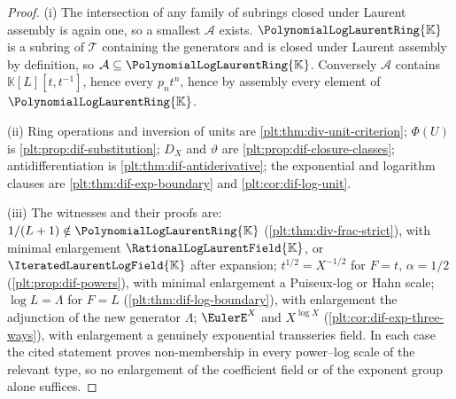 \documentclass[11pt,oneside]{article}
\theoremstyle{plain}
\theoremstyle{definition}
\theoremstyle{remark}
\newcommand{\K}{\mathbb{K}}
\newcommand{\PLlau}{\PolynomialLogLaurentRing{\K}}       %
\newcommand{\PLrat}{\RationalLogLaurentField{\K}}        %
\newcommand{\PLit}{\IteratedLaurentLogField{\K}}         %
\newcommand{\DX}{D_{X}}                                  %
\newcommand{\EulerOp}{\vartheta}                         %
\begin{document}
\begin{proof}
(i)  The intersection of any family of subrings closed under Laurent assembly
is again one, so a smallest \(\mathcal A\) exists.  \(\PLlau\) is a subring of
\(\mathcal T\) containing the generators and is closed under Laurent assembly
by definition, so \(\mathcal A\subseteq\PLlau\).  Conversely \(\mathcal A\)
contains \(\K[L][t,t^{-1}]\), hence every \(p_{n}t^{n}\), hence by assembly
every element of \(\PLlau\).

(ii)  Ring operations and inversion of units are
\cref{plt:thm:div-unit-criterion}; \(\Phi(U)\) is
\cref{plt:prop:dif-substitution}; \(\DX\) and \(\EulerOp\) are
\cref{plt:prop:dif-closure-classes}; antidifferentiation is
\cref{plt:thm:dif-antiderivative}; the exponential and logarithm clauses are
\cref{plt:thm:dif-exp-boundary} and \cref{plt:cor:dif-log-unit}.

(iii)  The witnesses and their proofs are: \(1/(L+1)\notin\PLlau\)
(\cref{plt:thm:div-frac-strict}), with minimal enlargement \(\PLrat\), or
\(\PLit\) after expansion; \(t^{1/2}=X^{-1/2}\) for \(F=t\), \(\alpha=1/2\)
(\cref{plt:prop:dif-powers}), with minimal enlargement a Puiseux-log or Hahn
scale; \(\log L=\Lambda\) for \(F=L\)
(\cref{plt:thm:dif-log-boundary}), with enlargement the adjunction of the new
generator \(\Lambda\); \(\EulerE^{X}\) and \(X^{\log X}\)
(\cref{plt:cor:dif-exp-three-ways}), with enlargement a genuinely
exponential transseries field.  In each case the cited statement proves
non-membership in every power--log scale of the relevant type, so no
enlargement of the coefficient field or of the exponent group alone suffices.
\end{proof}
\end{document}
